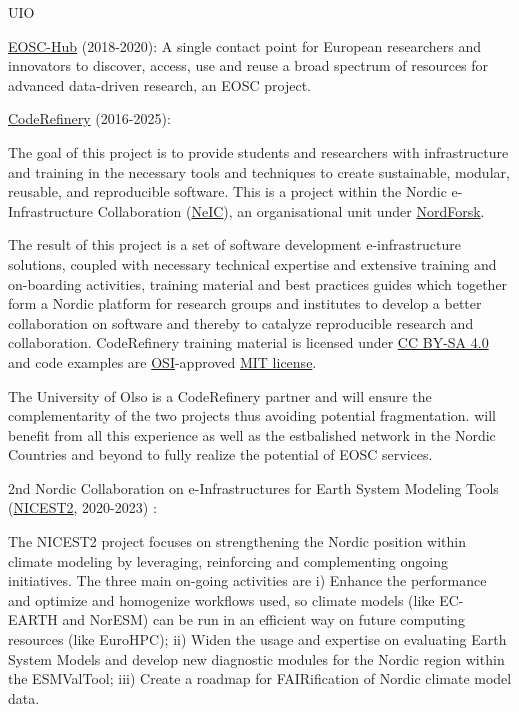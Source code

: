 \begin{sitedescription}{UIO}
\begin{compactenum}
\item \href{https://www.eosc-hub.eu}{EOSC-Hub}  (2018-2020):
A single contact point for European researchers and innovators to discover, access, use and reuse a broad spectrum of resources for advanced data-driven research, an EOSC project.

\item \href{https://coderefinery.org}{CodeRefinery} \label{desc:coderefinery} (2016-2025): 

The goal of this project is to provide students and researchers with infrastructure and training in the necessary tools and techniques to create sustainable, modular, reusable, and reproducible software.
This is a project within the Nordic e-Infrastructure Collaboration (\href{https://neic.no}{NeIC}), an organisational unit under \href{https://www.nordforsk.org/en}{NordForsk}.

The result of this project is a set of software development e-infrastructure solutions, coupled with necessary technical expertise and extensive training and on-boarding activities, training material and best practices guides which together form a Nordic platform for research groups and institutes to develop a better collaboration on software and thereby to catalyze reproducible research and collaboration.
\newline
CodeRefinery training material is licensed under \href{https://creativecommons.org/licenses/by-sa/4.0/}{CC BY-SA 4.0} and code examples are \href{https://opensource.org/}{OSI}-approved \href{https://opensource.org/licenses/mit-license.html}{MIT license}.

The University of Olso is a CodeRefinery partner and will ensure the complementarity of the two projects thus avoiding potential fragmentation. \TheProject will benefit from all this experience as well as the estbalished network in the Nordic Countries and beyond to fully realize the potential of \TheProject EOSC services. 
\newline


\item 2nd Nordic Collaboration on e-Infrastructures for Earth System Modeling Tools (\href{https://neic.no/nicest2}{NICEST2}, 2020-2023) \label{desc:nicest2}:

The NICEST2 project focuses on strengthening the Nordic position within climate modeling by leveraging, reinforcing and complementing ongoing initiatives. The three main on-going activities are i) Enhance the performance and optimize and homogenize workflows used, so climate models (like EC-EARTH and NorESM) can be run in an efficient way on future computing resources (like EuroHPC); ii) Widen the usage and expertise on evaluating Earth System Models and develop new diagnostic modules for the Nordic region within the ESMValTool; iii) Create a roadmap for FAIRification of Nordic climate model data.


\end{compactenum}
\end{sitedescription}
